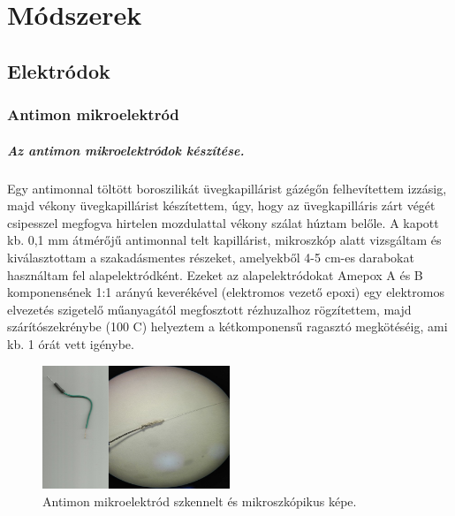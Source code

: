 \chapter{Módszerek}
\pagestyle{headings}
\section{Elektródok}
\subsection{Antimon mikroelektród}
\paragraph{Az antimon mikroelektródok készítése.}
Egy antimonnal töltött boroszilikát üvegkapillárist gázégőn felhevítettem izzásig, majd vékony üvegkapillárist készítettem, úgy, hogy az üvegkapilláris zárt végét csipesszel megfogva hirtelen mozdulattal vékony szálat húztam belőle. A kapott kb. 0,1 mm átmérőjű antimonnal telt kapillárist, mikroszkóp alatt vizsgáltam és kiválasztottam a szakadásmentes részeket, amelyekből 4-5 cm-es darabokat használtam fel alapelektródként. Ezeket az alapelektródokat Amepox A és B komponensének 1:1 arányú keverékével (elektromos vezető epoxi) egy elektromos elvezetés szigetelő műanyagától megfosztott rézhuzalhoz rögzítettem, majd szárítószekrénybe (100 \textdegree C) helyeztem a kétkomponensű ragasztó megkötéséig, ami kb. 1 órát vett igénybe.

\begin{figure}[h]
\centering
\includegraphics[width=0.5\textwidth]{img/antimon.png}
\caption{Antimon mikroelektród szkennelt és mikroszkópikus képe.}
\label{fig:ionophores}
\end{figure}

